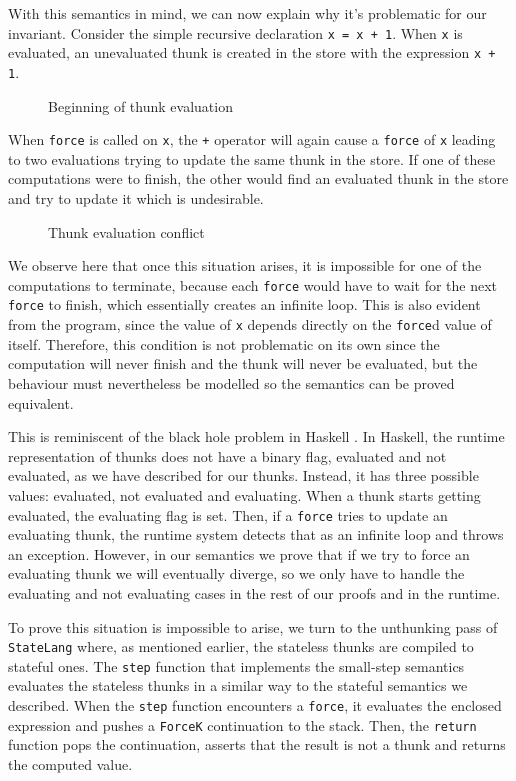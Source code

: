 \documentclass[sigconf]{acmart}
\newcommand{\hsinl}[1]{\texttt{#1}}
\newcommand{\code}[1]{\texttt{#1}}
\newcommand{\StateLang}{\code{StateLang}}
\begin{document}
With this semantics in mind, we can now explain why it's problematic for our
invariant. Consider the simple recursive declaration
\hsinl{x = x + 1}. When \code{x} is evaluated, an unevaluated thunk is created in
the store with the expression \code{x + 1}.
\begin{figure}[h]
  \centering
  
  \caption{Beginning of thunk evaluation}
  \label{fig:thunk-eval1}
\end{figure}
When \code{force} is called on \code{x}, the \code{+} operator will again cause
a \code{force} of \code{x} leading to two evaluations trying to update the same
thunk in the store. If one of these computations were to finish, the other would
find an evaluated thunk in the store and try to update it which is undesirable.
\begin{figure}[h]
  \centering
  
  \caption{Thunk evaluation conflict}
  \label{fig:thunk-eval2}
\end{figure}
We observe here that once this situation arises, it is impossible for one of the
computations to terminate, because each \code{force} would have to wait for the
next \code{force} to finish, which essentially creates an infinite loop. This is
also evident from the program, since the value of \code{x} depends directly on
the \code{force}d value of itself. Therefore, this condition is not problematic
on its own since the computation will never finish and the thunk will never be
evaluated, but the behaviour must nevertheless be modelled so the semantics can
be proved equivalent.

This is reminiscent of the black hole problem in Haskell
\cite{van1999optimising}. In Haskell, the runtime representation of thunks does
not have a binary flag, evaluated and not evaluated, as we have described for
our thunks. Instead, it has three possible values: evaluated, not evaluated and
evaluating. When a thunk starts getting evaluated, the evaluating flag is set.
Then, if a \code{force} tries to update an evaluating thunk, the runtime system
detects that as an infinite loop and throws an exception. However, in our
semantics we prove that if we try to force an evaluating thunk we will
eventually diverge, so we only have to handle the evaluating and not evaluating
cases in the rest of our proofs and in the runtime.

To prove this situation is impossible to arise, we turn to the unthunking pass
of \StateLang{} where, as mentioned earlier, the stateless thunks are compiled
to stateful ones. The \hsinl{step} function that implements the small-step
semantics evaluates the stateless thunks in a similar way to the stateful
semantics we described. When the \hsinl{step} function encounters a \code{force},
it evaluates the enclosed expression and pushes a \hsinl{ForceK} continuation to
the stack. Then, the \hsinl{return} function pops the continuation, asserts that
the result is not a thunk and returns the computed value.
\end{document}
